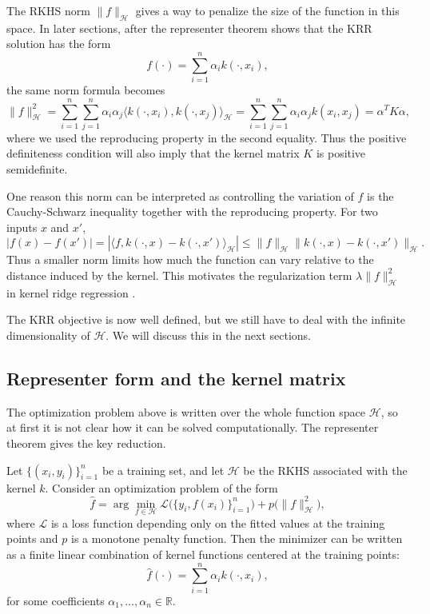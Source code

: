 The RKHS norm $\|f\|_{\mathcal{H}}$ gives a way to penalize the size of the function in this space. In later sections, after the representer theorem shows that the KRR solution has the form
\[
f(\cdot)=\sum_{i=1}^n \alpha_i k(\cdot,x_i),
\]
the same norm formula becomes
\[
\|f\|_{\mathcal H}^2=\sum_{i=1}^n\sum_{j=1}^n\alpha_i\alpha_j\langle k(\cdot,x_i),k(\cdot,x_j)\rangle_{\mathcal{H}}=\sum_{i=1}^n\sum_{j=1}^n \alpha_i\alpha_j k(x_i,x_j)=\alpha^T K\alpha,
\] where we used the reproducing property in the second equality. Thus the positive definiteness condition will also imply that the kernel matrix $K$ is positive semidefinite.

One reason this norm can be interpreted as controlling the variation of $f$ is the Cauchy-Schwarz inequality together with the reproducing property. For two inputs $x$ and $x'$,
\[
|f(x)-f(x')|
=
|\langle f,k(\cdot,x)-k(\cdot,x')\rangle_{\mathcal H}|
\leq
\|f\|_{\mathcal H}\|k(\cdot,x)-k(\cdot,x')\|_{\mathcal H}.
\]
Thus a smaller norm limits how much the function can vary relative to the distance induced by the kernel. This motivates the regularization term $\lambda\|f\|_{\mathcal H}^2$ in kernel ridge regression \citep{hofmann2008kernel,saunders1998ridge,zhu2023rkhs}.

The KRR objective is now well defined, but we still have to deal with the infinite dimensionality of $\mathcal H$. We will discuss this in the next sections.

\subsection{Representer form and the kernel matrix}

The optimization problem above is written over the whole function space $\mathcal{H}$, so at first it is not clear how it can be solved computationally. The representer theorem gives the key reduction. 

\begin{theorem}
Let $\{(x_i,y_i)\}_{i=1}^n$ be a training set, and let $\mathcal H$ be the RKHS associated with the kernel $k$. Consider an optimization problem of the form
\[
\hat f
=
\arg\min_{f\in\mathcal H}
\mathcal L\big(\{y_i,f(x_i)\}_{i=1}^n\big)
+
p\big(\|f\|_{\mathcal H}^2\big),
\]
where $\mathcal L$ is a loss function depending only on the fitted values at the training points and $p$ is a monotone penalty function. Then the minimizer can be written as a finite linear combination of kernel functions centered at the training points:
\[
\hat f(\cdot)
=
\sum_{i=1}^n \alpha_i k(\cdot,x_i),
\]
for some coefficients $\alpha_1,\ldots,\alpha_n\in\mathbb R$.
\end{theorem}

